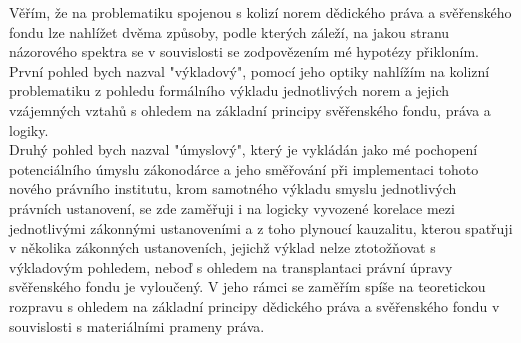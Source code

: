 \documentclass{article}
\begin{document}


Věřím, že na problematiku spojenou s kolizí norem dědického práva a svěřenského fondu lze nahlížet dvěma způsoby, podle kterých záleží, na jakou stranu názorového spektra se v souvislosti se zodpovězením mé hypotézy přikloním.\\

První pohled bych nazval "výkladový", pomocí jeho optiky nahlížím na kolizní problematiku z pohledu formálního výkladu jednotlivých norem a jejich vzájemných vztahů s ohledem na základní principy svěřenského fondu, práva a logiky.\\



Druhý pohled bych nazval "úmyslový", který je vykládán jako mé pochopení potenciálního úmyslu zákonodárce a jeho směřování při implementaci tohoto nového právního institutu, krom samotného výkladu smyslu jednotlivých právních ustanovení, se zde zaměřuji i na logicky vyvozené korelace mezi jednotlivými zákonnými ustanoveními a z toho plynoucí kauzalitu, kterou spatřuji v několika zákonných ustanoveních, jejichž výklad nelze ztotožňovat s výkladovým pohledem, neboď s ohledem na transplantaci právní úpravy svěřenského fondu je vyloučený. V jeho rámci se zaměřím spíše na teoretickou rozpravu s ohledem na základní principy dědického práva a svěřenského fondu v souvislosti s materiálními prameny práva.\\
\end{document}
